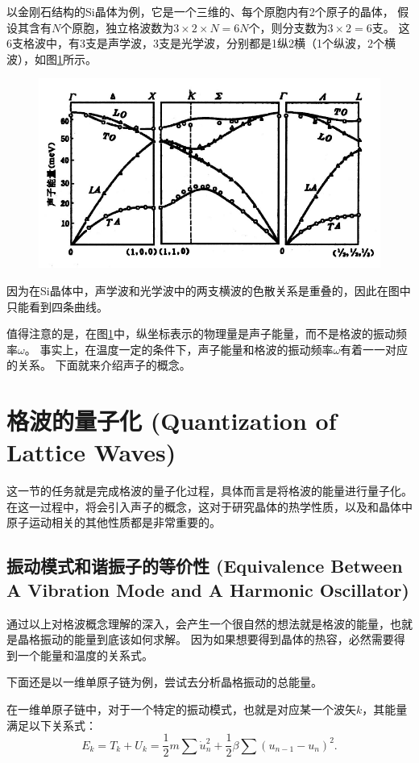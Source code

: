 \documentclass[declarePage]{ecnuthesis}
\begin{document}
以金刚石结构的Si晶体为例，它是一个三维的、每个原胞内有2个原子的晶体，%
假设其含有$N$个原胞，独立格波数为$3 \times 2  \times N= 6N$个，则分支数为$3 \times 2 = 6$支。%
这6支格波中，有3支是声学波，3支是光学波，分别都是1纵2横（1个纵波，2个横波），如图\ref{Si}所示。
\begin{figure}[htb]
    \centering
    \includegraphics[width=.7\textwidth]{Si.png}
     \label{Si}
\end{figure}

因为在Si晶体中，声学波和光学波中的两支横波的色散关系是重叠的，因此在图中只能看到四条曲线。

值得注意的是，在图\ref{Si}中，纵坐标表示的物理量是声子能量，而不是格波的振动频率$ω$。%
事实上，在温度一定的条件下，声子能量和格波的振动频率$ω$有着一一对应的关系。%
下面就来介绍声子的概念。

\section{格波的量子化 (Quantization of Lattice Waves)}

这一节的任务就是完成格波的量子化过程，具体而言是将格波的能量进行量子化。%
在这一过程中，将会引入声子的概念，这对于研究晶体的热学性质，以及和晶体中原子运动相关的其他性质都是非常重要的。

\subsection{振动模式和谐振子的等价性 (Equivalence Between A Vibration Mode and A Harmonic Oscillator)}

通过以上对格波概念理解的深入，会产生一个很自然的想法就是格波的能量，也就是晶格振动的能量到底该如何求解。%
因为如果想要得到晶体的热容，必然需要得到一个能量和温度的关系式。

下面还是以一维单原子链为例，尝试去分析晶格振动的总能量。%

在一维单原子链中，对于一个特定的振动模式，也就是对应某一个波矢$k$，其能量满足以下关系式：
\begin{equation}
    E_k=T_k+U_k=\frac{1}{2}m\sum\dot{u}_n^2+\frac{1}{2}\beta\sum(u_{n-1}-u_n)^2 \text{.}
\end{equation}
\end{document}
